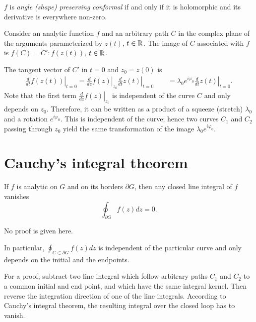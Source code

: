$f$
is
{\em angle (shape)  preserving}
{\em conformal} if and only if it is holomorphic and its derivative is everywhere non-zero.

 {\color{OliveGreen}
\bproof

Consider an analytic function $f$ and an arbitrary path $C$ in the complex plane of the arguments parameterized
by $z(t)$, $t\in {\Bbb R}$.
The image of $C$ associated with $f$ is  $f(C) = C': f(z(t))$, $t\in {\Bbb R}$.

The tangent vector of $C'$ in $t=0$ and $z_0=z(0)$ is
\begin{equation}
\begin{split}
\left. \frac{d }{dt} f(z(t))\right|_{t=0}
=
\left. \frac{d }{dz} f(z)\right|_{z_0}
\left. \frac{d }{dt} z(t)\right|_{t=0}
\qquad =
\lambda_0
e^{i\varphi_0}
\left. \frac{d }{dt} z(t)\right|_{t=0} .
\end{split}
\end{equation}
Note that the first term $\left. \frac{d }{dz} f(z)\right|_{z_0}$
is independent of the curve $C$ and only depends on $z_0$.
Therefore, it can be written as a product of a  squeeze (stretch) $\lambda_0 $
and a rotation $e^{i\varphi_0}$.
This is independent of the curve; hence
two curves $C_1$ and $C_2$ passing through $z_0$ yield the same
transformation of the image $\lambda_0
e^{i\varphi_0}$.
\eproof
}






 \section{Cauchy's integral theorem}
 If $f$ is analytic on $G$ and on its borders $\partial G$, then any closed line integral of $f$ vanishes
 \begin{equation}
\oint_{\partial G}f(z)dz=0
.
\label{2018-m-ch-ca-cit}
\end{equation}

No proof is given here.



In particular,
 $\oint_{C\subset \partial G}f(z)dz
$ is independent of the particular curve and only depends on the initial and the endpoints.

 {\color{OliveGreen}
\bproof
 For a proof, subtract two line integral which follow arbitrary paths  $C_1$ and $C_2$ to a common initial and end point,
and which have the same integral kernel.
Then reverse the integration direction of one of the line integrals.
According to Cauchy's integral theorem, the resulting integral over the closed loop has to vanish.
\eproof
}

